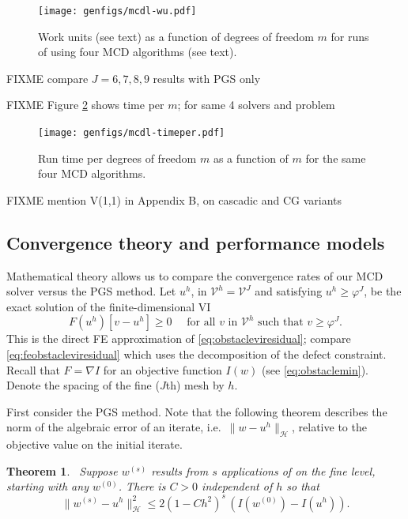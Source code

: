 \documentclass[letterpaper,final,12pt,reqno]{amsart}
\theoremstyle{claim}
\newtheorem{theorem}{Theorem}
\newcommand{\grad}{\nabla}
\numberwithin{equation}{section}
\numberwithin{figure}{section}
\numberwithin{table}{section}
\numberwithin{theorem}{section}
\begin{document}
\begin{figure}
\texttt{[image: genfigs/mcdl-wu.pdf]}
\caption{Work units (see text) as a function of degrees of freedom $m$ for runs of  using four MCD algorithms (see text).}
\label{fig:mcdl-wu}
\end{figure}

FIXME compare $J=6,7,8,9$ results with PGS only

FIXME Figure \ref{fig:mcdl-timeper} shows time per $m$; for same 4 solvers and problem

\begin{figure}
\texttt{[image: genfigs/mcdl-timeper.pdf]}
\caption{Run time per degrees of freedom $m$ as a function of $m$ for the same four MCD algorithms.}
\label{fig:mcdl-timeper}
\end{figure}

FIXME mention V(1,1) in Appendix B, \cite{Blumetal2004} on cascadic and CG variants

\subsection*{Convergence theory and performance models}  Mathematical theory allows us to compare the convergence rates of our MCD solver versus the PGS method.  Let $u^h$, in $\mathcal{V}^h = \mathcal{V}^J$ and satisfying $u^h \ge \varphi^J$, be the exact solution of the finite-dimensional VI
\begin{equation}
  F(u^h)[v-u^h] \ge 0 \quad \text{ for all } v \text{ in $\mathcal{V}^h$ such that } v \ge \varphi^J. \label{eq:feobstaclevioriginal}
\end{equation}
This is the direct FE approximation of \eqref{eq:obstacleviresidual}; compare \eqref{eq:feobstacleviresidual} which uses the decomposition of the defect constraint.  Recall that $F=\grad I$ for an objective function $I(w)$ (see \eqref{eq:obstaclemin}).  Denote the spacing of the fine ($J$th) mesh by $h$.

First consider the PGS method.  Note that the following theorem describes the norm of the algebraic error of an iterate, i.e.~$\|w-u^h\|_{\mathcal{H}}$, relative to the objective value on the initial iterate.

\begin{theorem} \cite[Prop.~4.5]{GraeserKornhuber2009}\,  \label{thm:pgsconvergence}  Suppose $w^{(s)}$  results from $s$ applications of  on the fine level, starting with any $w^{(0)}$.  There is $C>0$ independent of $h$ so that
\begin{equation}
  \|w^{(s)} - u^h\|_{\mathcal{H}}^2 \le 2 (1-C h^2)^s\,\left(I(w^{(0)}) - I(u^h)\right).  \label{eq:pgsconvergence}
\end{equation}
\end{theorem}
\end{document}
